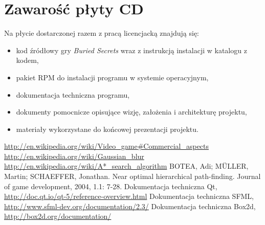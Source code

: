 \documentclass[licencjacka]{pracamgr}
\begin{document}
   
   
   

\chapter{Zawarość płyty CD}
  Na płycie dostarczonej razem z pracą licencjacką znajdują się:
  \begin{itemize}
   \item kod źródłowy gry \emph{Buried Secrets} wraz z instrukcją instalacji w katalogu z kodem,
   \item pakiet RPM do instalacji programu w systemie operacyjnym,
   \item dokumentacja techniczna programu,
   \item dokumenty pomocnicze opisujące wizję, założenia i architekturę projektu,
   \item materiały wykorzystane do końcowej prezentacji projektu.
  \end{itemize}

\begin{thebibliography}{99}

   \url{http://en.wikipedia.org/wiki/Video_game#Commercial_aspects}
   \url{http://en.wikipedia.org/wiki/Gaussian_blur}
   \url{http://en.wikipedia.org/wiki/A*_search_algorithm}
   BOTEA, Adi; MÜLLER, Martin; SCHAEFFER, Jonathan. Near optimal hierarchical path-finding. Journal of game development, 2004, 1.1: 7-28.
   Dokumentacja techniczna Qt, \url{http://doc.qt.io/qt-5/reference-overview.html}
   Dokumentacja techniczna SFML, \url{http://www.sfml-dev.org/documentation/2.3/}
   Dokumentacja techniczna Box2d, \url{http://box2d.org/documentation/}
  
  
\end{thebibliography}
\end{document}
